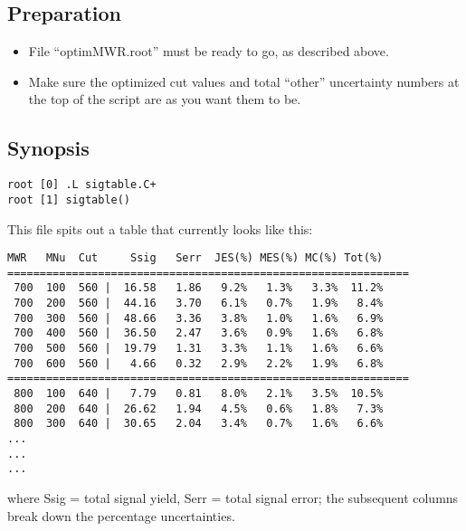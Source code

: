 \documentclass[english]{article}
\begin{document}
\subsection{Preparation}

\begin{itemize}
\item File ``optimMWR.root'' must be ready to go, as described above.
\item Make sure the optimized cut values and total ``other'' uncertainty
numbers at the top of the script are as you want them to be.
\end{itemize}

\subsection{Synopsis}
%
\begin{lstlisting}
root [0] .L sigtable.C+
root [1] sigtable()
\end{lstlisting}

This file spits out a table that currently looks like this:
%
\begin{verbatim}
MWR   MNu  Cut     Ssig   Serr  JES(%) MES(%) MC(%) Tot(%)
==============================================================
 700  100  560 |  16.58   1.86   9.2%   1.3%   3.3%  11.2%
 700  200  560 |  44.16   3.70   6.1%   0.7%   1.9%   8.4%
 700  300  560 |  48.66   3.36   3.8%   1.0%   1.6%   6.9%
 700  400  560 |  36.50   2.47   3.6%   0.9%   1.6%   6.8%
 700  500  560 |  19.79   1.31   3.3%   1.1%   1.6%   6.6%
 700  600  560 |   4.66   0.32   2.9%   2.2%   1.9%   6.8%
==============================================================
 800  100  640 |   7.79   0.81   8.0%   2.1%   3.5%  10.5%
 800  200  640 |  26.62   1.94   4.5%   0.6%   1.8%   7.3%
 800  300  640 |  30.65   2.04   3.4%   0.7%   1.6%   6.6%
...
...
...
\end{verbatim}

where Ssig = total signal yield, Serr = total signal error;
the subsequent columns break down the percentage uncertainties.
\end{document}
